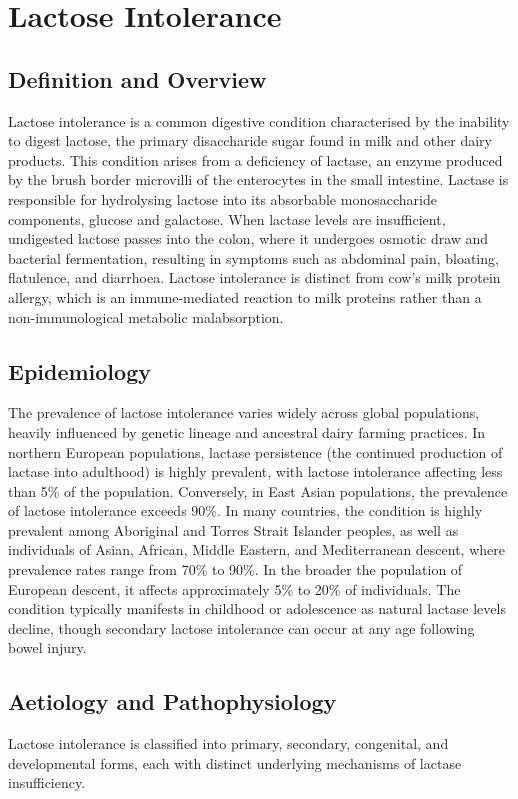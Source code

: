 \chapter{Lactose Intolerance}

\section*{Definition and Overview}
Lactose intolerance is a common digestive condition characterised by the inability to digest lactose, the primary disaccharide sugar found in milk and other dairy products. This condition arises from a deficiency of lactase, an enzyme produced by the brush border microvilli of the enterocytes in the small intestine. Lactase is responsible for hydrolysing lactose into its absorbable monosaccharide components, glucose and galactose. When lactase levels are insufficient, undigested lactose passes into the colon, where it undergoes osmotic draw and bacterial fermentation, resulting in symptoms such as abdominal pain, bloating, flatulence, and diarrhoea. Lactose intolerance is distinct from cow's milk protein allergy, which is an immune-mediated reaction to milk proteins rather than a non-immunological metabolic malabsorption.

\section*{Epidemiology}
The prevalence of lactose intolerance varies widely across global populations, heavily influenced by genetic lineage and ancestral dairy farming practices. In northern European populations, lactase persistence (the continued production of lactase into adulthood) is highly prevalent, with lactose intolerance affecting less than 5\% of the population. Conversely, in East Asian populations, the prevalence of lactose intolerance exceeds 90\%. In many countries, the condition is highly prevalent among Aboriginal and Torres Strait Islander peoples, as well as individuals of Asian, African, Middle Eastern, and Mediterranean descent, where prevalence rates range from 70\% to 90\%. In the broader the population of European descent, it affects approximately 5\% to 20\% of individuals. The condition typically manifests in childhood or adolescence as natural lactase levels decline, though secondary lactose intolerance can occur at any age following bowel injury.

\section*{Aetiology and Pathophysiology}
Lactose intolerance is classified into primary, secondary, congenital, and developmental forms, each with distinct underlying mechanisms of lactase insufficiency.


